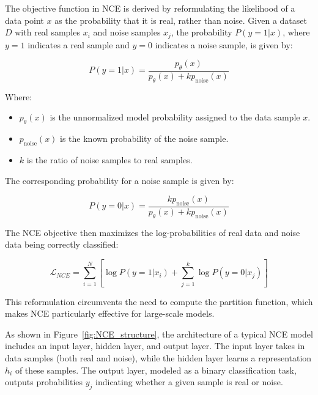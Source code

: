 The objective function in NCE is derived by reformulating the likelihood of a data point \( x \) as the probability that it is real, rather than noise. Given a dataset \( D \) with real samples \( x_i \) and noise samples \( x_j \), the probability \( P(y = 1 | x) \), where \( y = 1 \) indicates a real sample and \( y = 0 \) indicates a noise sample, is given by:

\begin{equation}
P(y = 1 | x) = \frac{p_{\theta}(x)}{p_{\theta}(x) + k p_{\text{noise}}(x)}
\end{equation}

Where:
\begin{itemize}
    \item \( p_{\theta}(x) \) is the unnormalized model probability assigned to the data sample \( x \).
    \item \( p_{\text{noise}}(x) \) is the known probability of the noise sample.
    \item \( k \) is the ratio of noise samples to real samples.
\end{itemize}

The corresponding probability for a noise sample is given by:

\begin{equation}
P(y = 0 | x) = \frac{k p_{\text{noise}}(x)}{p_{\theta}(x) + k p_{\text{noise}}(x)}
\end{equation}

The NCE objective then maximizes the log-probabilities of real data and noise data being correctly classified:

\begin{equation}
\mathcal{L}_{NCE} = \sum_{i=1}^{N} \left[ \log P(y=1 | x_i) + \sum_{j=1}^{k} \log P(y=0 | x_j) \right]
\end{equation}

This reformulation circumvents the need to compute the partition function, which makes NCE particularly effective for large-scale models.

As shown in Figure~\ref{fig:NCE_structure}, the architecture of a typical NCE model includes an input layer, hidden layer, and output layer. The input layer takes in data samples (both real and noise), while the hidden layer learns a representation \(h_i\) of these samples. The output layer, modeled as a binary classification task, outputs probabilities \(y_j\) indicating whether a given sample is real or noise.

